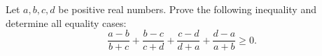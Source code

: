 Let $a,b,c,d$ be positive real numbers. Prove the following inequality
and determine all equality cases:
$$\frac{a-b}{b+c}+\frac{b-c}{c+d}+\frac{c-d}{d+a}+\frac{d-a}{a+b} \geq 0.$$